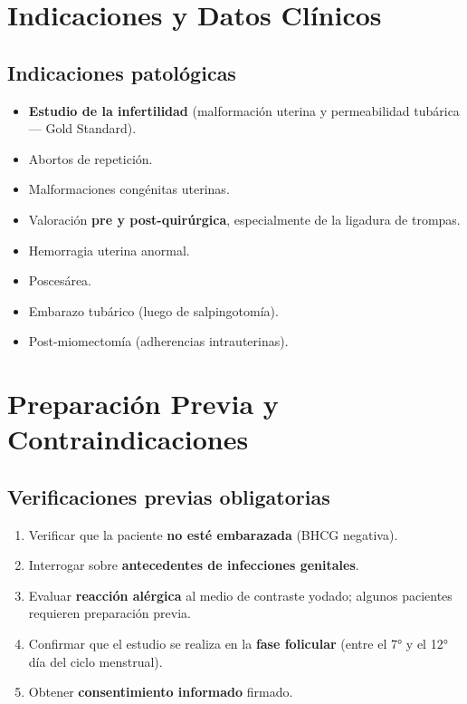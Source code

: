 \section*{Indicaciones y Datos Clínicos}

\subsection*{Indicaciones patológicas}

\begin{itemize}[noitemsep]
  \item \textbf{Estudio de la infertilidad} (malformación uterina y permeabilidad tubárica --- Gold Standard).
  \item Abortos de repetición.
  \item Malformaciones congénitas uterinas.
  \item Valoración \textbf{pre y post-quirúrgica}, especialmente de la ligadura de trompas.
  \item Hemorragia uterina anormal.
  \item Poscesárea.
  \item Embarazo tubárico (luego de salpingotomía).
  \item Post-miomectomía (adherencias intrauterinas).
\end{itemize}

\section*{Preparación Previa y Contraindicaciones}

\subsection*{Verificaciones previas obligatorias}

\begin{enumerate}[noitemsep]
  \item Verificar que la paciente \textbf{no esté embarazada} (BHCG negativa).
  \item Interrogar sobre \textbf{antecedentes de infecciones genitales}.
  \item Evaluar \textbf{reacción alérgica} al medio de contraste yodado; algunos pacientes requieren preparación previa.
  \item Confirmar que el estudio se realiza en la \textbf{fase folicular} (entre el 7° y el 12° día del ciclo menstrual).
  \item Obtener \textbf{consentimiento informado} firmado.
\end{enumerate}

